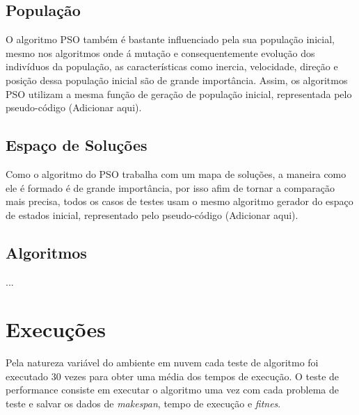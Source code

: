 


    \subsection{População}
        O algoritmo PSO também é bastante influenciado pela sua população inicial, mesmo nos algoritmos onde á mutação e consequentemente evolução dos indivíduos da população, as características como inercia, velocidade, direção e posição dessa população inicial são de grande importância. Assim, os algoritmos PSO utilizam a mesma função de geração de população inicial, representada pelo pseudo-código (Adicionar aqui).


    \subsection{Espaço de Soluções}


        Como o algoritmo do PSO trabalha com um mapa de soluções, a maneira como ele é formado é de grande importância, por isso afim de tornar a comparação mais precisa, todos os casos de testes usam o mesmo algoritmo gerador do espaço de estados inicial, representado pelo pseudo-código (Adicionar aqui).


    \subsection{Algoritmos}
        ...
    



\section{Execuções}
    Pela natureza variável do ambiente em nuvem cada teste de algoritmo foi executado 30 vezes para obter uma média dos tempos de execução. O teste de performance consiste em executar o algoritmo uma vez com cada problema de teste e salvar os dados de \textit{makespan}, tempo de execução e \textit{fitnes}.

